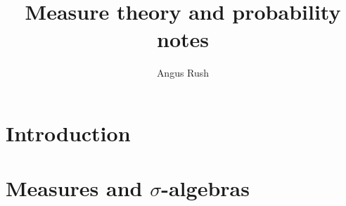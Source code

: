 \documentclass[a4paper,12pt]{scrreprt}
\title{Measure theory and probability notes}
\author{Angus Rush}
\theoremstyle{definition}
\theoremstyle{plain}
\theoremstyle{remark}
\begin{document}
\maketitle
\tableofcontents
\chapter{Introduction}
%
%
%
%
%
%
%
%
%
%

\chapter{Measures and \texorpdfstring{$\sigma$}{s}-algebras}
\end{document}
